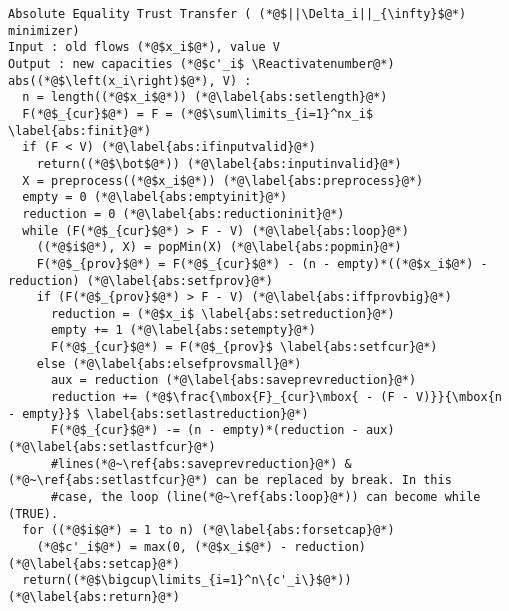 {}
\Suppressnumber
\begin{lstlisting}[label=abs, style=numbers]
Absolute Equality Trust Transfer ( (*@$||\Delta_i||_{\infty}$@*) minimizer)
Input : old flows (*@$x_i$@*), value V
Output : new capacities (*@$c'_i$ \Reactivatenumber@*)
abs((*@$\left(x_i\right)$@*), V) :
  n = length((*@$x_i$@*)) (*@\label{abs:setlength}@*)
  F(*@$_{cur}$@*) = F = (*@$\sum\limits_{i=1}^nx_i$ \label{abs:finit}@*)
  if (F < V) (*@\label{abs:ifinputvalid}@*)
    return((*@$\bot$@*)) (*@\label{abs:inputinvalid}@*)
  X = preprocess((*@$x_i$@*)) (*@\label{abs:preprocess}@*)
  empty = 0 (*@\label{abs:emptyinit}@*)
  reduction = 0 (*@\label{abs:reductioninit}@*)
  while (F(*@$_{cur}$@*) > F - V) (*@\label{abs:loop}@*)
    ((*@$i$@*), X) = popMin(X) (*@\label{abs:popmin}@*)
    F(*@$_{prov}$@*) = F(*@$_{cur}$@*) - (n - empty)*((*@$x_i$@*) - reduction) (*@\label{abs:setfprov}@*)
    if (F(*@$_{prov}$@*) > F - V) (*@\label{abs:iffprovbig}@*)
      reduction = (*@$x_i$ \label{abs:setreduction}@*)
      empty += 1 (*@\label{abs:setempty}@*)
      F(*@$_{cur}$@*) = F(*@$_{prov}$ \label{abs:setfcur}@*)
    else (*@\label{abs:elsefprovsmall}@*)
      aux = reduction (*@\label{abs:saveprevreduction}@*)
      reduction += (*@$\frac{\mbox{F}_{cur}\mbox{ - (F - V)}}{\mbox{n - empty}}$ \label{abs:setlastreduction}@*)
      F(*@$_{cur}$@*) -= (n - empty)*(reduction - aux) (*@\label{abs:setlastfcur}@*)
      #lines(*@~\ref{abs:saveprevreduction}@*) &(*@~\ref{abs:setlastfcur}@*) can be replaced by break. In this
      #case, the loop (line(*@~\ref{abs:loop}@*)) can become while (TRUE).
  for ((*@$i$@*) = 1 to n) (*@\label{abs:forsetcap}@*)
    (*@$c'_i$@*) = max(0, (*@$x_i$@*) - reduction) (*@\label{abs:setcap}@*)
  return((*@$\bigcup\limits_{i=1}^n\{c'_i\}$@*)) (*@\label{abs:return}@*)
\end{lstlisting}
